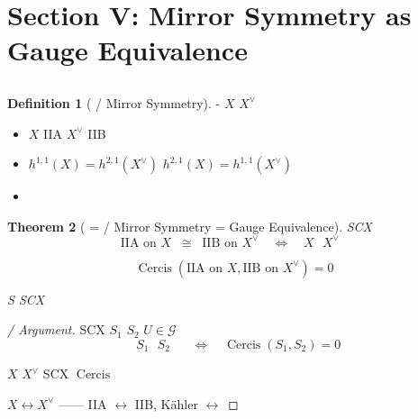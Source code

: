 \documentclass[12pt,a4paper]{article}
\theoremstyle{plain}
\newtheorem{theorem}{ Theorem}[section]
\theoremstyle{definition}
\newtheorem{definition}[theorem]{ Definition}
\newcommand{\Gauge}{\mathcal{G}}
\DeclareMathOperator{\Cercis}{Cercis}
\begin{document}
\newpage


\section{}
\section*{Section V: Mirror Symmetry as Gauge Equivalence}

\subsection{}

\begin{definition}[ / Mirror Symmetry]
- $X$  $X^\vee$ \textbf{}
\begin{itemize}
    \item  $X$  IIA  $X^\vee$  IIB 
    \item $h^{1,1}(X) = h^{2,1}(X^\vee)$  $h^{2,1}(X) = h^{1,1}(X^\vee)$
    \item \textbf{}
\end{itemize}
\end{definition}

\begin{theorem}[ =  / Mirror Symmetry = Gauge Equivalence]
\label{thm:mirror_gauge}
 SCX \textbf{}
\begin{equation}
    \text{IIA on } X \;\; \cong \;\; \text{IIB on } X^\vee
    \quad \Longleftrightarrow \quad
    \text{$X$  $X^\vee$ }
\end{equation}


\begin{equation}
    \Cercis(\text{IIA on } X, \text{IIB on } X^\vee) = 0
\end{equation}

 S  SCX 
\end{theorem}

\begin{proof}[ / Argument]
 SCX  $S_1$  $S_2$ 
 $U \in \Gauge$ 
\begin{equation}
    \text{ } S_1 \text{  } S_2 \text{ }
    \quad \Longleftrightarrow \quad
    \Cercis(S_1, S_2) = 0
\end{equation}

 $X$  $X^\vee$ \textbf{}
 SCX $\Cercis$ 

 $X \leftrightarrow X^\vee$ \textbf{}——
IIA $\leftrightarrow$ IIB, Kähler $\leftrightarrow$ 

\end{proof}
\end{document}
